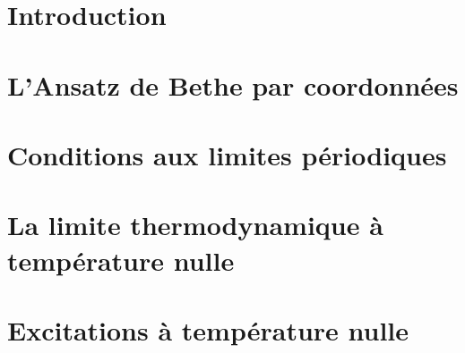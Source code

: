 
\section*{Introduction}



\section{L'Ansatz de Bethe par coordonnées}



\section{Conditions aux limites périodiques}


\section{La limite thermodynamique à température nulle}



\section{Excitations à température nulle}






















